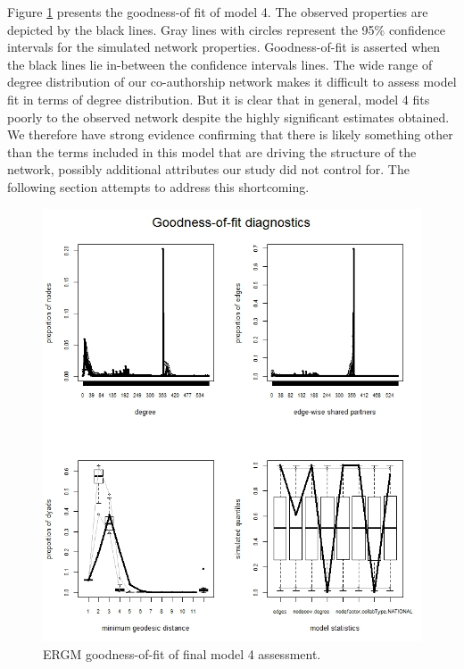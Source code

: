 Figure \ref{fig:malaria_ergm-gof} presents the goodness-of fit of model 4. The observed properties are depicted by the black lines. Gray lines with circles represent the 95\% confidence intervals for the simulated network properties. Goodness-of-fit is asserted when the black lines lie in-between the confidence intervals lines. The wide range of degree distribution of our co-authorship network makes it difficult to assess model fit in terms of degree distribution. But it is clear that in general, model 4 fits poorly to the observed network despite the highly significant estimates obtained. We therefore have strong evidence confirming that there is likely something other than the terms included in this model that are driving the structure of the network, possibly additional attributes our study did not control for. The following section attempts to address this shortcoming.

\begin{figure}[!h]
\centering
\includegraphics[scale=0.65]{Chapters/malaria/statMod/ergm_gof}
\caption{ERGM goodness-of-fit of final model 4 assessment.\\
}
\label{fig:malaria_ergm-gof}
\end{figure}

